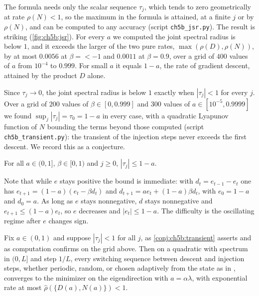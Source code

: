 The formula needs only the scalar sequence $\tau_j$, which tends to zero
geometrically at rate $\rho(N)<1$, so the maximum in the formula is attained, at a finite $j$ or by $\rho(N)$,
and can be computed to any accuracy (script \texttt{ch5b\_jsr.py}). The result
is striking (\cref{fig:ch5b:jsr}). For every $a$ we computed the joint spectral
radius is below $1$, and it exceeds the larger of the two pure rates, $\max(\rho(D),
\rho(N))$, by at most $0.0056$ at $\beta=\lt-1$ and $0.0011$ at $\beta=0.9$, over
a grid of $400$ values of $a$ from $10^{-4}$ to $0.999$. For small $a$ it equals
$1-a$, the rate of gradient descent, attained by the product $D$ alone.

Since $\tau_j\to0$, the joint spectral radius is below $1$ exactly when
$|\tau_j|<1$ for every $j$.
Over a grid of $200$ values of $\beta\in[0,0.999]$ and $300$ values of $a\in[10^{-5},0.9999]$ we found $\sup_j|\tau_j|=\tau_0=1-a$ in every case, with a quadratic Lyapunov function of $N$ bounding the terms beyond those computed (script \texttt{ch5b\_transient.py}): the transient of the injection steps never exceeds the first descent.
We record this as a conjecture.

\begin{conjecture}\label{conj:ch5b:transient}
For all $a\in(0,1]$, $\beta\in[0,1)$ and $j\ge0$, $|\tau_j|\le1-a$.
\end{conjecture}

Note that while $e$ stays positive the bound is immediate: with
$d_t=e_{t-1}-e_t$ one has $e_{t+1}=(1-a)(e_t-\beta d_t)$ and
$d_{t+1}=ae_t+(1-a)\beta d_t$, with $e_0=1-a$ and $d_0=a$. As long as $e$ stays
nonnegative, $d$ stays nonnegative and $e_{t+1}\le(1-a)e_t$, so $e$ decreases
and $|e_t|\le1-a$. The difficulty is the oscillating regime after $e$ changes
sign.

\begin{corollary}\label{cor:ch5b:anyswitch}
Fix $a\in(0,1)$ and suppose $|\tau_j|<1$ for all $j$, as
\cref{conj:ch5b:transient} asserts and as computation confirms on the grid
above. Then on a quadratic with spectrum in $(0,L]$ and step $1/L$, every
switching sequence between descent and injection steps, whether periodic,
random, or chosen adaptively from the state as in \smmstate, converges to the
minimizer on the eigendirection with $a=\alpha\lambda$, with exponential rate at
most $\hat\rho(\{D(a),N(a)\})<1$.
\end{corollary}

